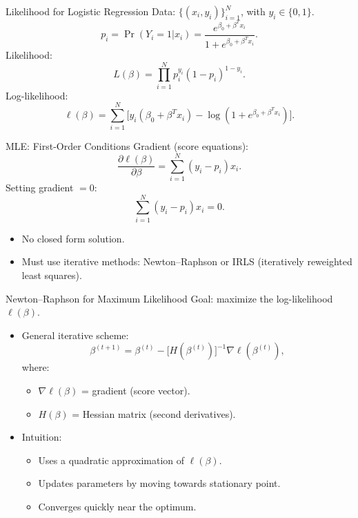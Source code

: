 \documentclass[../../main.tex]{subfiles}
\begin{document}
\begin{frame}{Likelihood for Logistic Regression}
Data: $\{(x_i,y_i)\}_{i=1}^N$, with $y_i \in \{0,1\}$.
\[
p_i = \Pr(Y_i=1|x_i) = \frac{e^{\beta_0 + \beta^T x_i}}{1+e^{\beta_0 + \beta^T x_i}}.
\]
Likelihood:
\[
L(\beta) = \prod_{i=1}^N p_i^{y_i} (1-p_i)^{1-y_i}.
\]
Log-likelihood:
\[
\ell(\beta) = \sum_{i=1}^N \Big[ y_i(\beta_0 + \beta^T x_i) - \log(1 + e^{\beta_0 + \beta^T x_i}) \Big].
\]
\end{frame}

\begin{frame}{MLE: First-Order Conditions}
Gradient (score equations):
\[
\frac{\partial \ell(\beta)}{\partial \beta} 
= \sum_{i=1}^N (y_i - p_i)x_i.
\]
Setting gradient $=0$:
\[
\sum_{i=1}^N (y_i - p_i)x_i = 0.
\]
\begin{itemize}
    \item No closed form solution.  
    \item Must use iterative methods: Newton–Raphson or IRLS (iteratively reweighted least squares).  
\end{itemize}
\end{frame}

\begin{frame}{Newton--Raphson for Maximum Likelihood}
Goal: maximize the log-likelihood $\ell(\beta)$.  
\begin{itemize}
    \item General iterative scheme:
    \[
    \beta^{(t+1)} = \beta^{(t)} - \Big[ H(\beta^{(t)}) \Big]^{-1} \nabla \ell(\beta^{(t)}),
    \]
    where:
    \begin{itemize}
        \item $\nabla \ell(\beta)$ = gradient (score vector).  
        \item $H(\beta)$ = Hessian matrix (second derivatives).  
    \end{itemize}
    \item Intuition:
    \begin{itemize}
        \item Uses a quadratic approximation of $\ell(\beta)$.  
        \item Updates parameters by moving towards stationary point.  
        \item Converges quickly near the optimum.  
    \end{itemize}
\end{itemize}
\end{frame}
\end{document}
